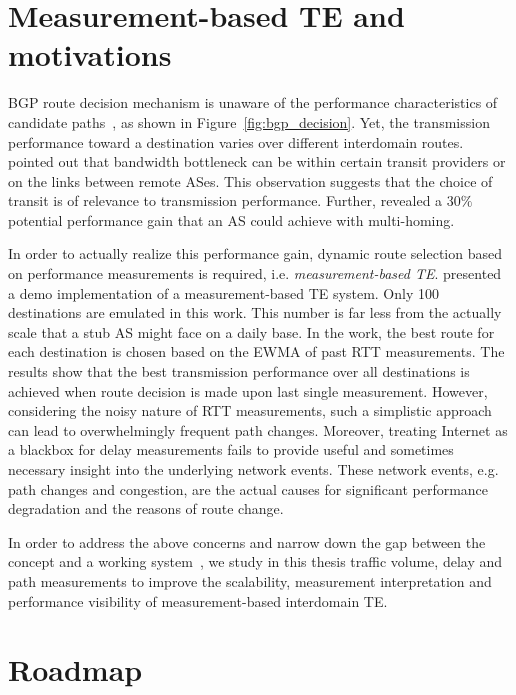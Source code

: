 \section{Measurement-based TE and motivations}
BGP route decision mechanism is unaware of the performance characteristics of candidate paths~\cite{Yannuzzi2005}, as shown in Figure~\ref{fig:bgp_decision}.
Yet, the transmission performance toward a destination varies over different interdomain routes.
\citet{Akella2003} pointed out that bandwidth bottleneck can be within certain transit providers or on the links between remote ASes.
This observation suggests that the choice of transit is of relevance to transmission performance.
Further, \citet{Akella2003a} revealed a $30\%$ potential performance gain that an AS could achieve with multi-homing.

In order to actually realize this performance gain, dynamic route selection based on performance measurements is required, i.e. \textit{measurement-based TE}.
\citet{Akella2008} presented a demo implementation of a measurement-based TE system.
Only 100 destinations are emulated in this work.
This number is far less from the actually scale that a stub AS might face on a daily base. 
In the work, the best route for each destination is chosen based on the \ac{EWMA} of past \acf{RTT} measurements. 
The results show that the best transmission performance over all destinations is achieved when route decision is made upon last single measurement.
However, considering the noisy nature of \ac{RTT} measurements, such a simplistic approach can lead to overwhelmingly frequent path changes. 
Moreover, treating Internet as a blackbox for delay measurements fails to provide useful and sometimes necessary insight into the underlying network events.
These network events, e.g. path changes and congestion, are the actual causes for significant performance degradation and the reasons of route change.

In order to address the above concerns and narrow down the gap between the concept and a working system~\cite{b6}, 
we study in this thesis traffic volume, delay and path measurements to improve the scalability, measurement interpretation and performance visibility of measurement-based interdomain TE.


\section{Roadmap}

